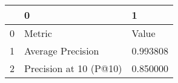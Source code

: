 \begin{tabular}{lll}
\toprule
 & 0 & 1 \\
\midrule
0 & Metric & Value \\
1 & Average Precision & 0.993808 \\
2 & Precision at 10 (P@10) & 0.850000 \\
\bottomrule
\end{tabular}
